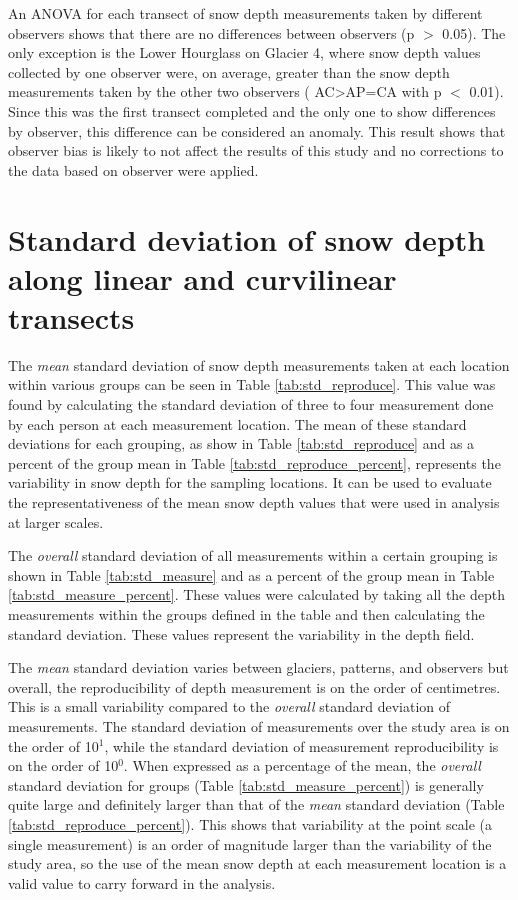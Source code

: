 \documentclass[12pt]{article}
\begin{document}
An ANOVA for each transect of snow depth measurements taken by different observers shows that there are no differences between observers (p $>$ 0.05). The only exception is the Lower Hourglass on Glacier 4, where snow depth values collected by one observer were, on average, greater than the snow depth measurements taken by the other two observers ( AC>AP=CA with p $<$ 0.01). Since this was the first transect completed and the only one to show differences by observer, this difference can be considered an anomaly. This result shows that observer bias is likely to not affect the results of this study and no corrections to the data based on observer were applied.

\section{Standard deviation of snow depth along linear and curvilinear transects}

The \textit{mean} standard deviation of snow depth measurements taken at each location within various groups can be seen in Table \ref{tab:std_reproduce}. This value was found by calculating the standard deviation of three to four measurement done by each person at each measurement location. The mean of these standard deviations for each grouping, as show in Table \ref{tab:std_reproduce} and as a percent of the group mean in Table \ref{tab:std_reproduce_percent}, represents the variability in snow depth for the sampling locations. It can be used to evaluate the representativeness of the mean snow depth values that were used in analysis at larger scales.

The \textit{overall} standard deviation of all measurements within a certain grouping is shown in Table \ref{tab:std_measure} and as a percent of the group mean in Table \ref{tab:std_measure_percent}. These values were calculated by taking all the depth measurements within the groups defined in the table and then calculating the standard deviation. These values represent the variability in the depth field. 

The \textit{mean} standard deviation varies between glaciers, patterns, and observers but overall, the reproducibility of depth measurement is on the order of centimetres. This is a small variability compared to the \textit{overall} standard deviation of measurements. The standard deviation of measurements over the study area is on the order of 10$^1$, while the standard deviation of measurement reproducibility is on the order of 10$^0$. When expressed as a percentage of the mean, the \textit{overall} standard deviation for groups (Table \ref{tab:std_measure_percent}) is generally quite large and definitely larger than that of the \textit{mean} standard deviation (Table \ref{tab:std_reproduce_percent}). This shows that variability at the point scale (a single measurement) is an order of magnitude larger than the variability of the study area, so the use of the mean snow depth at each measurement location is a valid value to carry forward in the analysis. 
\end{document}
